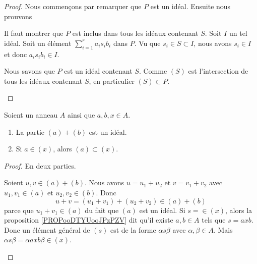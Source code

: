 \begin{proof}
	Nous commençons par remarquer que \( P\) est un idéal. Ensuite nous prouvons
	\begin{subproof}
		\spitem[\( P\subset (S)\)]
		Il faut montrer que \( P\) est inclus dans tous les idéaux contenant \( S\). Soit \( I\) un tel idéal. Soit un élément \( \sum_{i=1}^ra_is_ib_i\) dans \( P\). Vu que \( s_i\in S\subset I\), nous avons \( s_i\in I\) et donc \( a_is_ib_i\in I\).

		\spitem[\( (S)\subset P\)]
		Nous savons que \( P\) est un idéal contenant \( S\). Comme \( (S)\) est l'intersection de tous les idéaux contenant \( S\), en particulier \( (S)\subset P\).
	\end{subproof}
\end{proof}


\begin{proposition}	\label{PROPooFDJXooYbXEpo}
	Soient un anneau \( A\) ainsi que \( a,b,x\in A\).
	\begin{enumerate}
		\item		\label{ITEMooVFXMooPljoHf}
		      La partie \( (a)+(b)\) est un idéal.
		\item	\label{ITEMooMXHAooHPnAdu}
		      Si \( a\in (x)\), alors \( (a)\subset (x)\).
	\end{enumerate}
\end{proposition}

\begin{proof}
	En deux parties.
	\begin{subproof}
		\spitem[Pour \ref{ITEMooVFXMooPljoHf}]
		Soient \( u,v\in (a)+(b)\). Nous avons \( u=u_1+u_2\) et \( v=v_1+v_2\) avec \( u_1,v_1\in (a)\) et \( u_2,v_2\in (b)\). Donc
		\begin{equation}
			u+v=(u_1+v_1)+(u_2+v_2)\in (a)+(b)
		\end{equation}
		parce que \( u_1+v_1\in (a)\) du fait que \( (a)\) est un idéal.
		\spitem[Pour \ref{ITEMooMXHAooHPnAdu}]
		Si \( s=\in (x)\), alors la proposition \ref{PROPooDTYUooJPzPZV} dit qu'il existe \( a,b\in A\) tels que \( s=axb\). Donc un élément général de \( (s)\) est de la forme \( \alpha s\beta\) avec \( \alpha,\beta\in A\). Mais \( \alpha s\beta=\alpha axb\beta\in (x)\).
	\end{subproof}
\end{proof}

